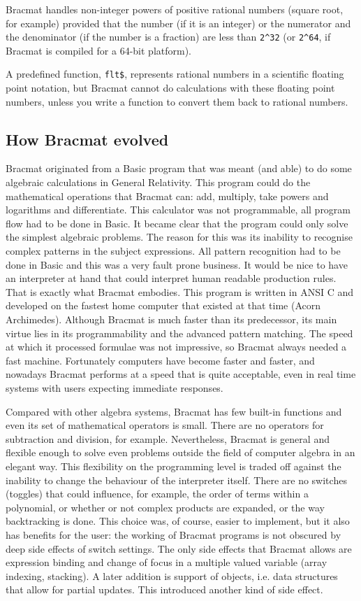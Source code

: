 \documentclass[12pt]{article}
\begin{document}
Bracmat handles non-integer powers of positive rational numbers
(square root, for example) provided that the number (if it is an
integer) or the numerator and the denominator (if the number is a
fraction) are less than \verb|2^32| (or \verb|2^64|, if Bracmat is compiled
for a 64-bit platform).

A predefined function, \verb|flt$|, represents rational
numbers in a scientific floating point notation, but Bracmat cannot do
calculations with these floating point numbers, unless you write a
function to convert them back to rational numbers.

\subsection{How Bracmat evolved}

Bracmat originated from a Basic program that was meant (and able) to
do some algebraic calculations in General Relativity. This program
could do the mathematical operations that Bracmat can: add, multiply,
take powers and logarithms and differentiate. This calculator was not
programmable, all program flow had to be done in Basic. It became
clear that the program could only solve the simplest algebraic
problems. The reason for this was its inability to recognise complex
patterns in the subject expressions. All pattern recognition had to be
done in Basic and this was a very fault prone business. It would be
nice to have an interpreter at hand that could interpret human
readable production rules. That is exactly what Bracmat embodies. This
program is written in ANSI C and developed on the fastest home
computer that existed at that time (Acorn Archimedes). Although
Bracmat is much faster than its predecessor, its main virtue lies in
its programmability and the advanced pattern matching. The speed at
which it processed formulae was not impressive, so Bracmat always
needed a fast machine. Fortunately computers have become faster and
faster, and nowadays Bracmat performs at a speed that is quite
acceptable, even in real time systems with users expecting immediate
responses.

Compared with other algebra systems, Bracmat has few built-in
functions and even its set of mathematical operators is small. There
are no operators for subtraction and division, for
example. Nevertheless, Bracmat is general and flexible enough to solve
even problems outside the field of computer algebra in an elegant
way. This flexibility on the programming level is traded off against
the inability to change the behaviour of the interpreter itself. There
are no switches (toggles) that could influence, for example, the order
of terms within a polynomial, or whether or not complex products are
expanded, or the way backtracking is done. This choice was, of course,
easier to implement, but it also has benefits for the user: the
working of Bracmat programs is not obscured by deep side effects of
switch settings. The only side effects that Bracmat allows are
expression binding and change of focus in a multiple valued variable
(array indexing, stacking). A later addition is support of objects,
i.e. data structures that allow for partial updates. This introduced
another kind of side effect.
\end{document}
